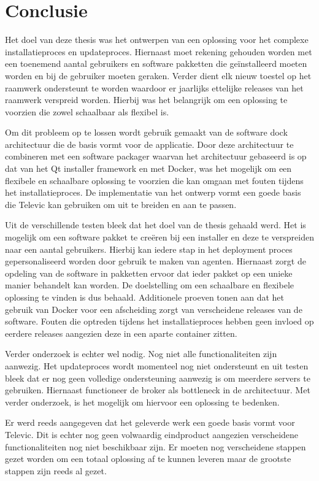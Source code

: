 \chapter{Conclusie}
Het doel van deze thesis was het ontwerpen van een oplossing voor het complexe installatieproces en updateproces.
Hiernaast moet rekening gehouden worden met een toenemend aantal gebruikers en software pakketten die geïnstalleerd moeten worden en bij de gebruiker moeten geraken.
Verder dient elk nieuw toestel op het raamwerk ondersteunt te worden waardoor er jaarlijks ettelijke releases van het raamwerk verspreid worden.
Hierbij was het belangrijk om een oplossing te voorzien die zowel schaalbaar als flexibel is.

Om dit probleem op te lossen wordt gebruik gemaakt van de software dock architectuur die de basis vormt voor de applicatie.
Door deze architectuur te combineren met een software packager waarvan het architectuur gebaseerd is op dat van het Qt installer framework en met Docker, was het mogelijk om een flexibele en schaalbare oplossing te voorzien die kan omgaan met fouten tijdens het installatieproces.
De implementatie van het ontwerp vormt een goede basis die Televic kan gebruiken om uit te breiden en aan te passen.

Uit de verschillende testen bleek dat het doel van de thesis gehaald werd.
Het is mogelijk om een software pakket te creëren bij een installer en deze te verspreiden naar een aantal gebruikers.
Hierbij kan iedere stap in het deployment proces gepersonaliseerd worden door gebruik te maken van agenten.
Hiernaast zorgt de opdeling van de software in pakketten ervoor dat ieder pakket op een unieke manier behandelt kan worden.
De doelstelling om een schaalbare en flexibele oplossing te vinden is dus behaald.
Additionele proeven tonen aan dat het gebruik van Docker voor een afscheiding zorgt van verscheidene releases van de software.
Fouten die optreden tijdens het installatieproces hebben geen invloed op eerdere releases aangezien deze in een aparte container zitten.

Verder onderzoek is echter wel nodig.
Nog niet alle functionaliteiten zijn aanwezig.
Het updateproces wordt momenteel nog niet ondersteunt en uit testen bleek dat er nog geen volledige ondersteuning aanwezig is om meerdere servers te gebruiken.
Hiernaast functioneer de broker als bottleneck in de architectuur.
Met verder onderzoek, is het mogelijk om hiervoor een oplossing te bedenken.

Er werd reeds aangegeven dat het geleverde werk een goede basis vormt voor Televic.
Dit is echter nog geen volwaardig eindproduct aangezien verscheidene functionaliteiten nog niet beschikbaar zijn.
Er moeten nog verscheidene stappen gezet worden om een totaal oplossing af te kunnen leveren maar de grootste stappen zijn reeds al gezet.